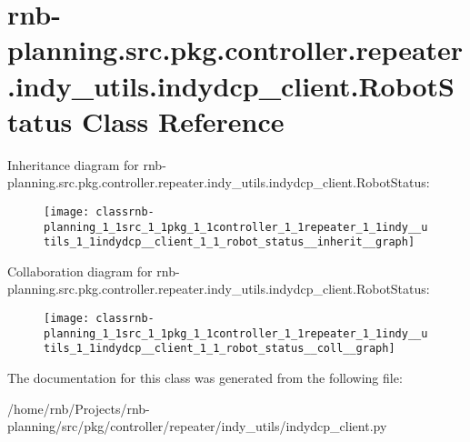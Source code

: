 \hypertarget{classrnb-planning_1_1src_1_1pkg_1_1controller_1_1repeater_1_1indy__utils_1_1indydcp__client_1_1_robot_status}{}\section{rnb-\/planning.src.\+pkg.\+controller.\+repeater.\+indy\+\_\+utils.\+indydcp\+\_\+client.\+Robot\+Status Class Reference}
\label{classrnb-planning_1_1src_1_1pkg_1_1controller_1_1repeater_1_1indy__utils_1_1indydcp__client_1_1_robot_status}


Inheritance diagram for rnb-\/planning.src.\+pkg.\+controller.\+repeater.\+indy\+\_\+utils.\+indydcp\+\_\+client.\+Robot\+Status\+:\nopagebreak
\begin{figure}[H]
\begin{center}
\leavevmode
\texttt{[image: classrnb-planning\_1\_1src\_1\_1pkg\_1\_1controller\_1\_1repeater\_1\_1indy\_\_utils\_1\_1indydcp\_\_client\_1\_1\_robot\_status\_\_inherit\_\_graph]}
\end{center}
\end{figure}


Collaboration diagram for rnb-\/planning.src.\+pkg.\+controller.\+repeater.\+indy\+\_\+utils.\+indydcp\+\_\+client.\+Robot\+Status\+:\nopagebreak
\begin{figure}[H]
\begin{center}
\leavevmode
\texttt{[image: classrnb-planning\_1\_1src\_1\_1pkg\_1\_1controller\_1\_1repeater\_1\_1indy\_\_utils\_1\_1indydcp\_\_client\_1\_1\_robot\_status\_\_coll\_\_graph]}
\end{center}
\end{figure}


The documentation for this class was generated from the following file\+:\begin{DoxyCompactItemize}
\item 
/home/rnb/\+Projects/rnb-\/planning/src/pkg/controller/repeater/indy\+\_\+utils/indydcp\+\_\+client.\+py\end{DoxyCompactItemize}
